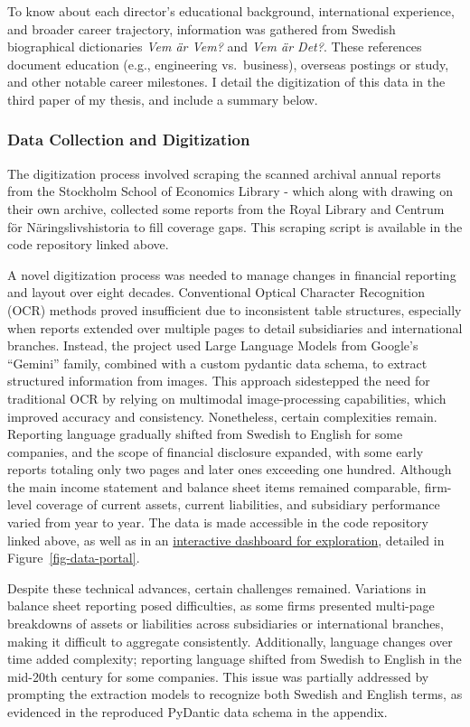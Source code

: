 \documentclass[
]{article}
\begin{document}
To know about each director's educational background, international
experience, and broader career trajectory, information was gathered from
Swedish biographical dictionaries \emph{Vem är Vem?} and \emph{Vem är
Det?}. These references document education (e.g., engineering
vs.~business), overseas postings or study, and other notable career
milestones. I detail the digitization of this data in the third paper of
my thesis, and include a summary below.

\subsubsection{Data Collection and
Digitization}\label{data-collection-and-digitization}

The digitization process involved scraping the scanned archival annual
reports from the Stockholm School of Economics Library - which along
with drawing on their own archive, collected some reports from the Royal
Library and Centrum för Näringslivshistoria to fill coverage gaps. This
scraping script is available in the code repository linked above.

A novel digitization process was needed to manage changes in financial
reporting and layout over eight decades. Conventional Optical Character
Recognition (OCR) methods proved insufficient due to inconsistent table
structures, especially when reports extended over multiple pages to
detail subsidiaries and international branches. Instead, the project
used Large Language Models from Google's ``Gemini'' family, combined
with a custom pydantic data schema, to extract structured information
from images. This approach sidestepped the need for traditional OCR by
relying on multimodal image-processing capabilities, which improved
accuracy and consistency. Nonetheless, certain complexities remain.
Reporting language gradually shifted from Swedish to English for some
companies, and the scope of financial disclosure expanded, with some
early reports totaling only two pages and later ones exceeding one
hundred. Although the main income statement and balance sheet items
remained comparable, firm-level coverage of current assets, current
liabilities, and subsidiary performance varied from year to year. The
data is made accessible in the code repository linked above, as well as
in an
\href{https://swedish-annual-reports-archive-explorer.streamlit.app/}{interactive
dashboard for exploration}, detailed in Figure~\ref{fig-data-portal}.

Despite these technical advances, certain challenges remained.
Variations in balance sheet reporting posed difficulties, as some firms
presented multi-page breakdowns of assets or liabilities across
subsidiaries or international branches, making it difficult to aggregate
consistently. Additionally, language changes over time added complexity;
reporting language shifted from Swedish to English in the mid-20th
century for some companies. This issue was partially addressed by
prompting the extraction models to recognize both Swedish and English
terms, as evidenced in the reproduced PyDantic data schema in the
appendix.
\end{document}
